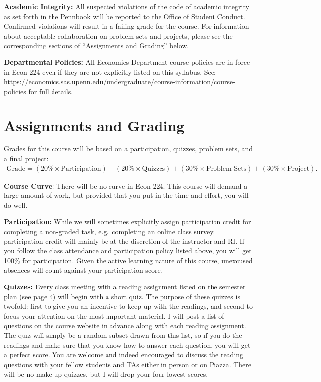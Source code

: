 \documentclass[11pt, letterpaper]{article}
\begin{document}
\medskip

\noindent \textbf{Academic Integrity:} 
All suspected violations of the code of academic integrity as set forth in the Pennbook will be reported to the Office of Student Conduct. 
Confirmed violations will result in a failing grade for the course. 
For information about acceptable collaboration on problem sets and projects, please see the corresponding sections of ``Assignments and Grading'' below.

\medskip

\noindent \textbf{Departmental Policies: } 
All Economics Department course policies are in force in Econ 224 even if they are not explicitly listed on this syllabus. 
See: \url{https://economics.sas.upenn.edu/undergraduate/course-information/course-policies} for full details.

\medskip

\section*{Assignments and Grading}
Grades for this course will be based on a participation, quizzes, problem sets, and a final project:
	\begin{equation*}
	\begin{split}
    \mbox{Grade} = (20\% \times \mbox{Participation})  + (20\% \times \mbox{Quizzes}) + (30\% \times \mbox{Problem Sets}) +  (30\% \times \mbox{Project}).
	\end{split}
	\end{equation*}

\medskip

\noindent \textbf{Course Curve:}
There will be no curve in Econ 224. 
This course will demand a large amount of work, but provided that you put in the time and effort, you will do well. 

\medskip 

\noindent \textbf{Participation:} 
While we will sometimes explicitly assign participation credit for completing a non-graded task, e.g.\ completing an online class survey, participation credit will mainly be at the discretion of the instructor and RI.
If you follow the class attendance and participation policy listed above, you will get 100\% for participation.  
Given the active learning nature of this course, unexcused absences will count against your participation score.

\medskip


\noindent \textbf{Quizzes:} 
Every class meeting with a reading assignment listed on the semester plan (see page 4) will begin with a short quiz.
The purpose of these quizzes is twofold: first to give you an incentive to keep up with the readings, and second to focus your attention on the most important material.
I will post a list of questions on the course website in advance along with each reading assignment.
The quiz will simply be a random subset drawn from this list, so if you do the readings and make sure that you know how to answer each question, you will get a perfect score.
You are welcome and indeed encouraged to discuss the reading questions with your fellow students and TAs either in person or on Piazza.
There will be no make-up quizzes, but I will drop your four lowest scores.
\end{document}
